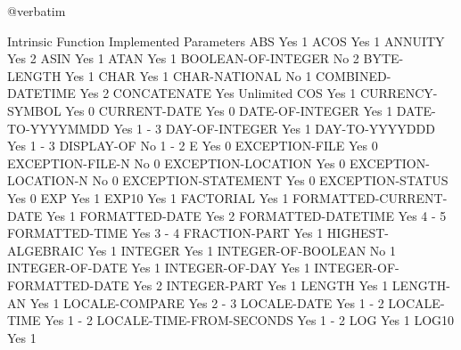 @verbatim

Intrinsic Function              Implemented     Parameters
ABS                             Yes             1
ACOS                            Yes             1
ANNUITY                         Yes             2
ASIN                            Yes             1
ATAN                            Yes             1
BOOLEAN-OF-INTEGER              No              2
BYTE-LENGTH                     Yes             1
CHAR                            Yes             1
CHAR-NATIONAL                   No              1
COMBINED-DATETIME               Yes             2
CONCATENATE                     Yes             Unlimited
COS                             Yes             1
CURRENCY-SYMBOL                 Yes             0
CURRENT-DATE                    Yes             0
DATE-OF-INTEGER                 Yes             1
DATE-TO-YYYYMMDD                Yes             1 - 3
DAY-OF-INTEGER                  Yes             1
DAY-TO-YYYYDDD                  Yes             1 - 3
DISPLAY-OF                      No              1 - 2
E                               Yes             0
EXCEPTION-FILE                  Yes             0
EXCEPTION-FILE-N                No              0
EXCEPTION-LOCATION              Yes             0
EXCEPTION-LOCATION-N            No              0
EXCEPTION-STATEMENT             Yes             0
EXCEPTION-STATUS                Yes             0
EXP                             Yes             1
EXP10                           Yes             1
FACTORIAL                       Yes             1
FORMATTED-CURRENT-DATE          Yes             1
FORMATTED-DATE                  Yes             2
FORMATTED-DATETIME              Yes             4 - 5
FORMATTED-TIME                  Yes             3 - 4
FRACTION-PART                   Yes             1
HIGHEST-ALGEBRAIC               Yes             1
INTEGER                         Yes             1
INTEGER-OF-BOOLEAN              No              1
INTEGER-OF-DATE                 Yes             1
INTEGER-OF-DAY                  Yes             1
INTEGER-OF-FORMATTED-DATE       Yes             2
INTEGER-PART                    Yes             1
LENGTH                          Yes             1
LENGTH-AN                       Yes             1
LOCALE-COMPARE                  Yes             2 - 3
LOCALE-DATE                     Yes             1 - 2
LOCALE-TIME                     Yes             1 - 2
LOCALE-TIME-FROM-SECONDS        Yes             1 - 2
LOG                             Yes             1
LOG10                           Yes             1
